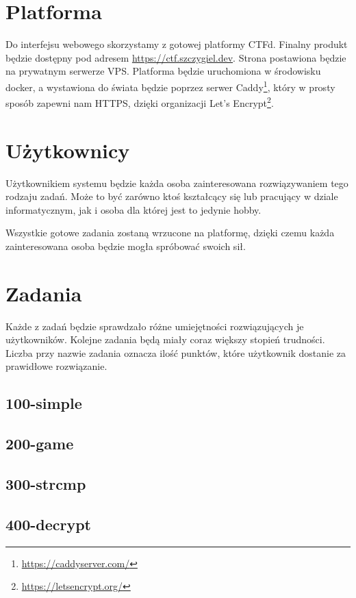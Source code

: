 \documentclass[language=polish,type=eng]{aghmodern}
\begin{document}
\section{Platforma}

Do interfejsu webowego skorzystamy z gotowej platformy CTFd.
Finalny produkt będzie dostępny pod adresem
\href{https://ctf.szczygiel.dev}{https://ctf.szczygiel.dev}.
Strona postawiona będzie na prywatnym serwerze VPS. Platforma będzie
uruchomiona w środowisku docker, a wystawiona do świata będzie poprzez serwer
Caddy\footnote{\url{https://caddyserver.com/}}, który w prosty sposób zapewni nam HTTPS,
dzięki organizacji Let's Encrypt\footnote{\url{https://letsencrypt.org/}}.

\section{Użytkownicy}

Użytkownikiem systemu będzie każda osoba zainteresowana rozwiązywaniem
tego rodzaju zadań. Może to być zarówno ktoś kształcący się lub pracujący
w dziale informatycznym, jak i osoba dla której jest to jedynie hobby.

Wszystkie gotowe zadania zostaną wrzucone na platformę, dzięki czemu
każda zainteresowana osoba będzie mogła spróbować swoich sił.

\section{Zadania}

Każde z zadań będzie sprawdzało różne umiejętności rozwiązujących je użytkowników.
Kolejne zadania będą miały coraz większy stopień trudności. Liczba przy nazwie zadania
oznacza ilość punktów, które użytkownik dostanie za prawidłowe rozwiązanie.

\subsection{100-simple}
\subsection{200-game}
\subsection{300-strcmp}
\subsection{400-decrypt}
\end{document}
